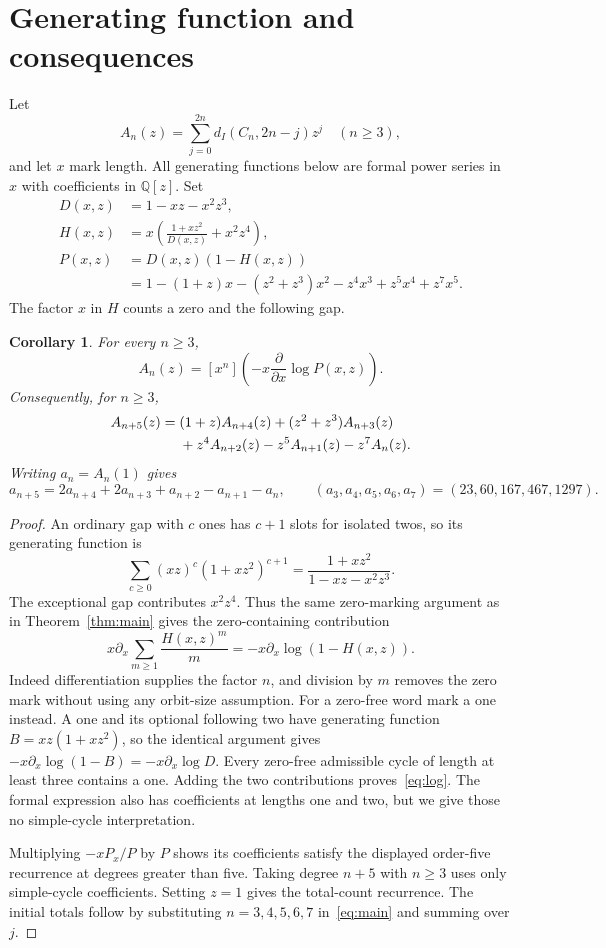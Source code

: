 \documentclass[11pt]{article}
\newtheorem{corollary}[theorem]{Corollary}
\newcommand{\di}{d_I}
\newcommand{\Q}{\mathbb Q}
\begin{document}
\section{Generating function and consequences}
Let
\[
 A_n(z)=\sum_{j=0}^{2n}\di(C_n,2n-j)z^j \quad(n\geq3),
\]
and let $x$ mark length. All generating functions below are formal power
series in $x$ with coefficients in $\Q[z]$. Set
\begin{align*}
 D(x,z)&=1-xz-x^2z^3,\\
 H(x,z)&=x\left(\frac{1+xz^2}{D(x,z)}+x^2z^4\right),\\
 P(x,z)&=D(x,z)(1-H(x,z))\\
 &=1-(1+z)x-(z^2+z^3)x^2-z^4x^3+z^5x^4+z^7x^5.
\end{align*}
The factor $x$ in $H$ counts a zero and the following gap.

\begin{corollary}\label{cor:gen}
For every $n\geq3$,
\begin{equation}\label{eq:log}
 A_n(z)=[x^n]\left(-x\frac{\partial}{\partial x}\log P(x,z)\right).
\end{equation}
Consequently, for $n\geq3$,
\begin{align}\label{eq:weighted}
 A_{n+5}(z)={}&(1+z)A_{n+4}(z)+(z^2+z^3)A_{n+3}(z)\notag\\
 &+z^4A_{n+2}(z)-z^5A_{n+1}(z)-z^7A_n(z).
\end{align}
Writing $a_n=A_n(1)$ gives
\[
 a_{n+5}=2a_{n+4}+2a_{n+3}+a_{n+2}-a_{n+1}-a_n,
 \qquad (a_3,a_4,a_5,a_6,a_7)=(23,60,167,467,1297).
\]
\end{corollary}
\begin{proof}
An ordinary gap with $c$ ones has $c+1$ slots for isolated twos, so its
generating function is
\[
 \sum_{c\geq0}(xz)^c(1+xz^2)^{c+1}
       =\frac{1+xz^2}{1-xz-x^2z^3}.
\]
The exceptional gap contributes $x^2z^4$. Thus the same zero-marking
argument as in Theorem~\ref{thm:main} gives the zero-containing contribution
\[
 x\partial_x\sum_{m\geq1}\frac{H(x,z)^m}{m}
       =-x\partial_x\log(1-H(x,z)).
\]
Indeed differentiation supplies the factor $n$, and division by $m$
removes the zero mark without using any orbit-size assumption.
For a zero-free word mark a one instead. A one and its optional following
two have generating function $B=xz(1+xz^2)$, so the identical argument
gives $-x\partial_x\log(1-B)=-x\partial_x\log D$.
Every zero-free admissible cycle of length at least three contains a one.
Adding the two contributions proves~\eqref{eq:log}. The formal expression
also has coefficients at lengths one and two, but we give those no
simple-cycle interpretation.

Multiplying $-xP_x/P$ by $P$ shows its coefficients satisfy the displayed
order-five recurrence at degrees greater than five. Taking degree $n+5$
with $n\geq3$ uses only simple-cycle coefficients. Setting $z=1$ gives
the total-count recurrence. The initial totals follow by substituting
$n=3,4,5,6,7$ in~\eqref{eq:main} and summing over $j$.
\end{proof}
\end{document}
